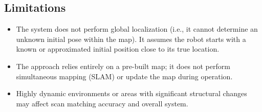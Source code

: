 \subsection{Limitations}
\begin{itemize}
    \item The system does not perform global localization (i.e., it cannot determine an unknown initial pose within the map). It assumes the robot starts with a known or approximated initial position close to its true location.
    \item The approach relies entirely on a pre-built map; it does not perform simultaneous mapping (SLAM) or update the map during operation.
    \item Highly dynamic environments or areas with significant structural changes may affect scan matching accuracy and overall system.
\end{itemize}



